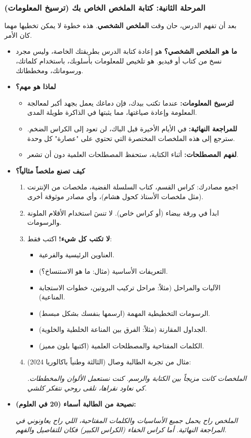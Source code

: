 \documentclass[12pt,a4paper]{book}
\newcommand{\quoteAr}[1]{%
	\begin{myquote}
		\itshape #1
	\end{myquote}
}
\begin{document}
	\subsubsection*{المرحلة الثانية: كتابة الملخص الخاص بك (ترسيخ المعلومات)}
	بعد أن تفهم الدرس، حان وقت \textbf{الملخص الشخصي}. هذه خطوة لا يمكن تخطيها مهما كان الأمر.
	\begin{itemize}
		\item \textbf{ما هو الملخص الشخصي؟} هو إعادة كتابة الدرس بطريقتك الخاصة، وليس مجرد نسخ من كتاب أو فيديو. هو تلخيص للمعلومات بأسلوبك، باستخدام كلماتك، ورسوماتك، ومخططاتك.
		\item \textbf{لماذا هو مهم؟}
		\begin{itemize}
			\item \textbf{لترسيخ المعلومات:} عندما تكتب بيدك، فإن دماغك يعمل بجهد أكبر لمعالجة المعلومة وإعادة صياغتها، مما يثبتها في الذاكرة طويلة المدى.
			\item \textbf{للمراجعة النهائية:} في الأيام الأخيرة قبل الباك، لن تعود إلى الكراس الضخم. سترجع إلى هذه الملخصات المختصرة التي تحتوي على "عصارة" كل وحدة.
			\item \textbf{لفهم المصطلحات:} أثناء الكتابة، ستحفظ المصطلحات العلمية دون أن تشعر.
		\end{itemize}
		\item \textbf{كيف تصنع ملخصاً مثالياً؟}
		\begin{enumerate}
			\item اجمع مصادرك: كراس القسم، كتاب السلسلة الفضية، ملخصات من الإنترنت (مثل ملخصات الأستاذ كحول هشام)، وأي مصادر موثوقة أخرى.
			\item ابدأ في ورقة بيضاء (أو كراس خاص). لا تنسَ استخدام الأقلام الملونة والرسومات.
			\item \textbf{لا تكتب كل شيء!} اكتب فقط:
			\begin{itemize}
				\item العناوين الرئيسية والفرعية.
				\item التعريفات الأساسية (مثال: ما هو الاستنساخ؟).
				\item الآليات والمراحل (مثلاً: مراحل تركيب البروتين، خطوات الاستجابة المناعية).
				\item الرسومات التخطيطية المهمة (ارسمها بنفسك بشكل مبسط).
				\item الجداول المقارنة (مثلاً: الفرق بين المناعة الخلطية والخلوية).
				\item الكلمات المفتاحية والمصطلحات العلمية (اكتبها بلون مميز).
			\end{itemize}
			\item مثال من تجربة الطالبة وصال (الثالثة وطنياً باكالوريا 2024): \quoteAr{الملخصات كانت مزيجاً بين الكتابة والرسم. كنت نستعمل الألوان والمخططات. كي نعاود نقراها، نلقى روحي نتفكر كلشي.}
		\end{enumerate}
		\item \textbf{نصيحة من الطالبة أسماء (20 في العلوم):} \quoteAr{الملخص راح يحمل جميع الأساسيات والكلمات المفتاحية، اللي راح يعاونوني في المراجعة النهائية. أما كراس الخفاء (الكراس الكبير) فكان للتفاصيل والفهم.}
	\end{itemize}
	
\end{document}
